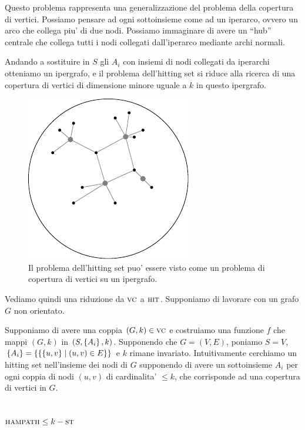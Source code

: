 Questo problema rappresenta una generalizzazione del problema della copertura di vertici. Possiamo
pensare ad ogni sottoinsieme come ad un iperarco, ovvero un arco che collega piu' di due nodi.
Possiamo immaginare di avere un ``hub'' centrale che collega tutti i nodi collegati dall'iperarco
mediante archi normali.

Andando a sostituire in $S$ gli $A_{i}$ con insiemi di nodi collegati da iperarchi otteniamo un
ipergrafo, e il problema dell'hitting set si riduce alla ricerca di una copertura di vertici di
dimensione minore uguale a $k$ in questo ipergrafo.

\begin{figure}[h]
    \begin{center}
        \includegraphics{./img/NPClass/HYPERGRAPH.pdf}
        \caption{Il problema dell'hitting set puo' essere visto come un problema di copertura di
        vertici su un ipergrafo.}
    \end{center}
\end{figure}

Vediamo quindi una riduzione da $\textsc{vc}$ a $\textsc{hit}$. Supponiamo di lavorare con un grafo $G$ non
orientato.

Supponiamo di avere una coppia $(G,k) \in \textsc{vc}$ e costruiamo una funzione $f$ che mappi $(G,k)$ in
$(S,\left\{A_{i}\right\},k)$. Supponendo che $G = (V,E)$, poniamo $S = V$, $\left\{A_{i}\right\} = \left\{\left\{\left\{u,v\right\}
\mid (u,v) \in E\right\}\right\}$ e $k$ rimane invariato. Intuitivamente cerchiamo un hitting set nell'insieme dei
nodi di $G$ supponendo di avere un sottoinsieme $A_{i}$ per ogni coppia di nodi $(u,v)$ di
cardinalita' $\leq k$, che corrisponde ad una copertura di vertici in $G$.


\subsection{$\textsc{hampath} \leq k-\textsc{st}$}


